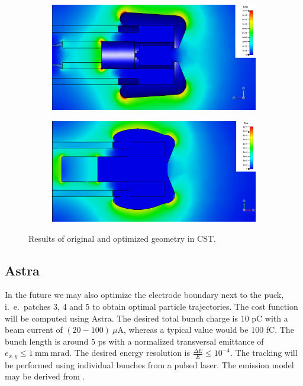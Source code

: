 \begin{center}
\begin{figure}[H]
   \begin{subfigure}{0.45\textwidth}
      \includegraphics[width=\textwidth]{figures/200kV/cst/efield_orig}
   \end{subfigure}
   \begin{subfigure}{0.45\textwidth}
      \includegraphics[width=\textwidth]{figures/200kV/cst/efield_insulator}
   \end{subfigure}
   \caption{Results of original and optimized geometry in CST.}
\end{figure}
\end{center}

\subsection{Astra}
In the future we may also optimize the electrode boundary next to the puck, i.~e.~patches 3, 4 and 5 to obtain optimal particle trajectories. The cost function will be computed using Astra.
The desired total bunch charge is $10$ pC with a beam current of $(20-100)\ \mu\mathrm{A}$, whereas a typical value would be $100$ fC. The bunch length is around $5$ ps with a normalized transversal emittance of $e_{x,y} \leq 1\ \mathrm{mm\ mrad}$. The desired energy resolution is $\frac{\Delta E}{E} \leq 10^{-4}$.
The tracking will be performed using individual bunches from a pulsed laser. The emission model may be derived from \cite{wagner}.
